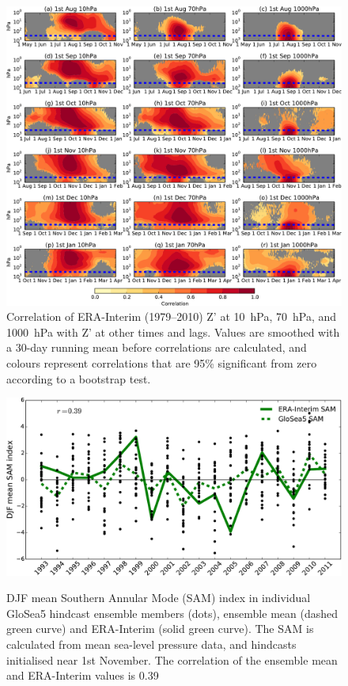  \begin{figure}[p] \vspace*{-3cm} \centering
 \noindent\includegraphics[width=\textwidth]{figures/chapter-seasonal/lag_height_corr_obs.pdf}
 \caption[Lag-height correlation of $Z'$ at 10~hPa and 1000~hPa.]{Correlation of
   ERA-Interim (1979--2010) Z' at 10~hPa, 70~hPa, and 1000~hPa with Z' at other
   times and lags. Values are smoothed with a 30-day running mean before
   correlations are calculated, and colours represent correlations that are 95\%
   significant from zero according to a bootstrap test.}
 \label{fig:lag_height_corr_obs}
 \end{figure}

\begin{figure}[t]
  \noindent\includegraphics[width=\textwidth,angle=0]{figures/chapter-seasonal/DJF_SAM.pdf}\\
  \caption[GloSea5 predictions of the SAM.]{DJF mean Southern Annular Mode (SAM)
    index in individual GloSea5 hindcast ensemble members (dots), ensemble mean
    (dashed green curve) and ERA-Interim (solid green curve). The SAM is
    calculated from mean sea-level pressure data, and hindcasts initialised near
    1st November. The correlation of the ensemble mean and ERA-Interim values is
    0.39}\label{fig:djf_sam_ts}
\end{figure}


